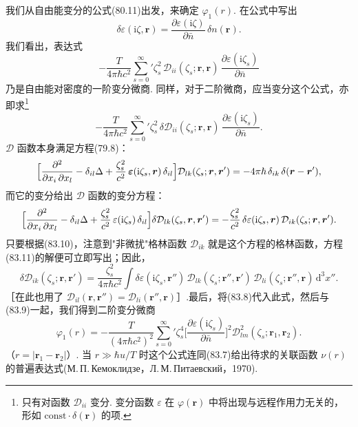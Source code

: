我们从自由能变分的公式(80.11)出发，来确定 $\varphi_1(r)$. 在公式中写出
\begin{equation}
  \delta\varepsilon(\mathrm{i}\zeta,\bm{r})=\frac{\partial\varepsilon(\mathrm{i}\zeta)}{\partial\bar{n}}\,\delta n(\bm{r}).
\end{equation}
我们看出，表达式
\begin{equation*}
  -\frac{T}{4\pi\hbar c^{2}}\sum_{s=0}^{\infty}{}'\zeta_s^{2}\,\mathcal{D}_{ii}(\zeta_s;\bm{r},\bm{r})\,\frac{\partial\varepsilon(\mathrm{i}\zeta_s)}{\partial\bar{n}}
\end{equation*}
乃是自由能对密度的一阶变分微商. 同样，对于二阶微商，应当变分这个公式，亦即求\footnote{只有对函数 $\mathcal{D}_{ii}$ 变分. 变分函数 $\varepsilon$ 在 $\varphi(\bm{r})$ 中将出现与远程作用力无关的，形如 $\mathrm{const}\cdot\delta(\bm{r})$ 的项.}
\begin{equation}
  -\frac{T}{4\pi\hbar c^{2}}\sum_{s=0}^{\infty}{}'\zeta_s^{2}\,\delta\mathcal{D}_{ii}(\zeta_s;\bm{r},\bm{r})\,\frac{\partial\varepsilon(\mathrm{i}\zeta_s)}{\partial\bar{n}}.
\end{equation}
$\mathcal{D}$ 函数本身满足方程(79.8)：
\begin{equation}
  \Bigl[\frac{\partial^{2}}{\partial x_i\,\partial x_l}-\delta_{il}\Delta+\frac{\zeta_s^{2}}{c^{2}}\,\bm{\varepsilon}(\mathrm{i}\zeta_s,\bm{r})\,\delta_{il}\Bigr]\mathcal{D}_{lk}(\zeta_s;\bm{r},\bm{r}')=-4\pi\hbar\,\delta_{ik}\,\delta(\bm{r}-\bm{r}'),
\end{equation}
而它的变分给出 $\mathcal{D}$ 函数的变分方程：
\begin{equation}
  \Bigl[\frac{\partial^{2}}{\partial x_i\,\partial x_l}-\delta_{il}\Delta+\frac{\zeta_s^{2}}{c^{2}}\,\varepsilon(\mathrm{i}\zeta_s)\,\delta_{il}\Bigr]\delta\mathcal{D}_{lk}(\zeta_s,\bm{r},\bm{r}')=-\frac{\zeta_s^{2}}{c^{2}}\,\delta\varepsilon(\mathrm{i}\zeta_s,\bm{r})\,\mathcal{D}_{ik}(\zeta_s;\bm{r},\bm{r}').
\end{equation}
只要根据(83.10)，注意到"非微扰"格林函数 $\mathcal{D}_{ik}$ 就是这个方程的格林函数，方程(83.11)的解便可立即写出；因此，
\begin{equation*}
  \delta\mathcal{D}_{ik}(\zeta_s;\bm{r},\bm{r}')=\frac{\zeta_s^{2}}{4\pi\hbar c^{2}}\int\delta\varepsilon(\mathrm{i}\zeta_s,\bm{r}'')\,\mathcal{D}_{lk}(\zeta_s;\bm{r}'',\bm{r}')\,\mathcal{D}_{li}(\zeta_s;\bm{r}'',\bm{r})\,\mathrm{d}^{3}x''.
\end{equation*}
［在此也用了 $\mathcal{D}_{il}(\bm{r},\bm{r}'')=\mathcal{D}_{li}(\bm{r}'',\bm{r})$］.最后，将(83.8)代入此式，然后与(83.9)一起，我们得到二阶变分微商
\begin{equation}
  \varphi_1(r)=-\frac{T}{(4\pi\hbar c^{2})^{2}}\sum_{s=0}^{\infty}{}'\zeta_s^{4}\biggl[\frac{\partial\varepsilon(\mathrm{i}\zeta_s)}{\partial\bar{n}}\biggr]^{2}\mathcal{D}^{2}_{lm}(\zeta_s;\bm{r}_1,\bm{r}_2).
\end{equation}
（$r=|\bm{r}_1-\bm{r}_2|$）. 当 $r\gg\hbar u/T$ 时这个公式连同(83.7)给出待求的关联函数 $\nu(r)$ 的普遍表达式(М.\,П.\,Кемоклидзе，Л.\,М.\,Питаевский，1970).

